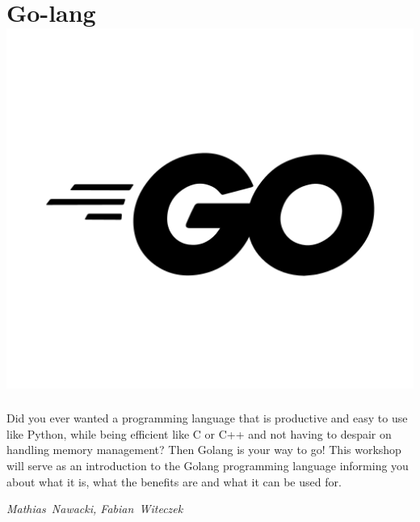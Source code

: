 
\section*{Go-lang\hfill\includegraphics[width=.35\linewidth]{images/GolangLogo.png}}

Did you ever wanted a programming language that is productive and easy to use like Python, while being efficient like C or C++ and not having to despair on handling memory management? Then Golang is your way to go!
This workshop will serve as an introduction to the Golang programming language informing you about what it is, what the benefits are and what it can be used for.

\hfill\textit{Mathias~Nawacki, Fabian~Witeczek}